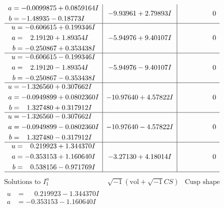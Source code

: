 \documentclass[1p]{elsarticle_modified}
\theoremstyle{definition}
\newcommand{\I}{\sqrt{-1}}
\begin{document}
$$\begin{array}{c|c|c}
\begin{aligned}
a &= -0.0099875 + 0.0859164 I \\
b &= -1.48935 - 0.18773 I\end{aligned}
 & -9.93961 + 2.79893 I & \phantom{-0.000000 } 0 \\ \hline\begin{aligned}
u &= -0.606615 + 0.199346 I \\
a &= \phantom{-}2.19120 + 1.89354 I \\
b &= -0.250867 + 0.353438 I\end{aligned}
 & -5.94976 + 9.40107 I & \phantom{-0.000000 } 0 \\ \hline\begin{aligned}
u &= -0.606615 - 0.199346 I \\
a &= \phantom{-}2.19120 - 1.89354 I \\
b &= -0.250867 - 0.353438 I\end{aligned}
 & -5.94976 - 9.40107 I & \phantom{-0.000000 } 0 \\ \hline\begin{aligned}
u &= -1.326560 + 0.307662 I \\
a &= -0.0949899 + 0.0802360 I \\
b &= \phantom{-}1.327480 + 0.317912 I\end{aligned}
 & -10.97640 + 4.57822 I & \phantom{-0.000000 } 0 \\ \hline\begin{aligned}
u &= -1.326560 - 0.307662 I \\
a &= -0.0949899 - 0.0802360 I \\
b &= \phantom{-}1.327480 - 0.317912 I\end{aligned}
 & -10.97640 - 4.57822 I & \phantom{-0.000000 } 0 \\ \hline\begin{aligned}
u &= \phantom{-}0.219923 + 1.344370 I \\
a &= -0.353153 + 1.160640 I \\
b &= \phantom{-}0.538156 - 0.971769 I\end{aligned}
 & -3.27130 + 4.18014 I & \phantom{-0.000000 } 0\\
 \hline 
 \end{array}$$\newpage$$\begin{array}{c|c|c}  
\text{Solutions to }I^u_{1}& \I (\text{vol} + \sqrt{-1}CS) & \text{Cusp shape}\\
 \hline 
\begin{aligned}
u &= \phantom{-}0.219923 - 1.344370 I \\
a &= -0.353153 - 1.160640 I \\

\end{aligned}
\end{array}$$
\end{document}
